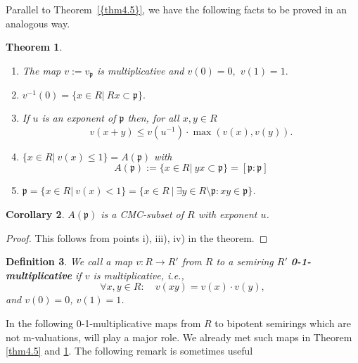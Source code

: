 \documentclass [12pt,a4paper,reqno]{amsart}
\newtheorem{thm}{Theorem} [section]
\newtheorem{cor}[thm]{Corollary}
\newtheorem{defn}[thm]{Definition}
\begin{document}
Parallel to {Theorem~\ref{{thm4.5}}}, we have the following facts to be
proved in an analogous way.

\begin{thm}\label{thm4.10}
\quad{}

\begin{enumerate}\item[i)] The map $v:=v_{\mathfrak p}$ is
multiplicative and $v(0)=0,$ $v(1)=1.$

\item[ii)] $v^{-1}(0)=\{x\in R| \ Rx\subset {\mathfrak p}\}.$

\item[iii)] If $u$ is an exponent of ${\mathfrak p}$ then, for all
$x,y\in R$
\begin{equation}\label{4.3}
v(x+y)\le v(u^{-1})\cdot\max(v(x),v(y)).\end{equation}

\item[iv)]$ \{x\in R| \ v(x)\le 1\}=A({\mathfrak p})$ with
\begin{equation}\label{4.4}
A({\mathfrak p}):=\{x\in R| \ yx\subset{\mathfrak p}\}=[{\mathfrak p}:{\mathfrak p}]\end{equation}

\item[v)] $ {\mathfrak p} = \{x\in R| \ v(x)<1\}=\{ x\in R {\ {|} \ }  \exists y \in R \setminus {\mathfrak p} : xy \in {\mathfrak p}  \}$. \end{enumerate}\end{thm}

\begin{cor}\label{cor4.11}
$A({\mathfrak p})$ is a CMC-subset of $R$ with exponent $u$.
\end{cor}

\begin{proof} This follows from points i), iii), iv) in the theorem.
\end{proof}

\begin{defn} We call a map $v: R \to R' $ from $R$  to a semiring
$R'$ \textbf{0-1-multiplicative} if $v$ is multiplicative, i.e.,
$$ \forall x,y \in R: \quad v(xy) = v(x) \cdot v(y),$$
and $v(0)=0$, $v(1)=1$.
\end{defn}

In the following 0-1-multiplicative maps from $R$ to bipotent
semirings which are not m-valuations, will play  a major role. We
already met such maps in Theorem \ref{thm4.5} and \ref{thm4.10}.
The following remark is sometimes useful
\end{document}
